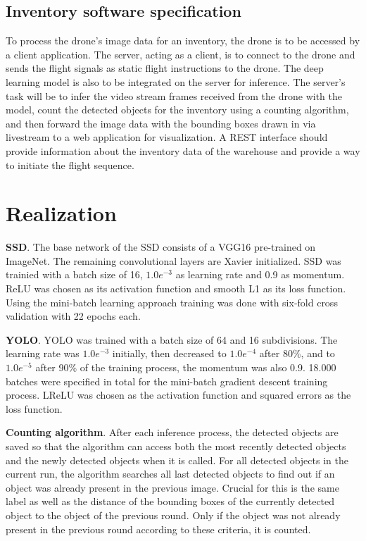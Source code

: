 \documentclass[a4paper, 10pt, journal]{wissarbIEEE}      %
\begin{document}
\subsection{Inventory software specification}

To process the drone's image data for an inventory, the drone is to be accessed by a client application. The server, acting as a client, is to connect to the drone and sends the flight signals as static flight instructions to the drone. The deep learning model is also to be integrated on the server for inference. The server's task will be to infer the video stream frames received from the drone with the model, count the detected objects for the inventory using a counting algorithm, and then forward the image data with the bounding boxes drawn in via livestream to a web application for visualization. A REST interface should provide information about the inventory data of the warehouse and provide a way to initiate the flight sequence.

\section{Realization} \label{realization}

\textbf{SSD}. The base network of the SSD consists of a VGG16 pre-trained on ImageNet. The remaining convolutional layers are Xavier initialized. SSD was trainied with a batch size of 16, $1.0e^{-3}$ as learning rate and 0.9 as momentum. ReLU was chosen as its activation function and smooth L1 as its loss function. Using the mini-batch learning approach training was done with six-fold cross validation with 22 epochs each.

\textbf{YOLO}. YOLO was trained with a batch size of 64 and 16 subdivisions. The learning rate was $1.0e^{-3}$ initially, then decreased to $1.0e^{-4}$ after 80\%, and to $1.0e^{-5}$ after 90\% of the training process, the momentum was also 0.9. 18.000 batches were specified in total for the mini-batch gradient descent training process. LReLU was chosen as the activation function and squared errors as the loss function.

\textbf{Counting algorithm}. After each inference process, the detected objects are saved so that the algorithm can access both the most recently detected objects and the newly detected objects when it is called. For all detected objects in the current run, the algorithm searches all last detected objects to find out if an object was already present in the previous image. Crucial for this is the same label as well as the distance of the bounding boxes of the currently detected object to the object of the previous round. Only if the object was not already present in the previous round according to these criteria, it is counted.
\end{document}
